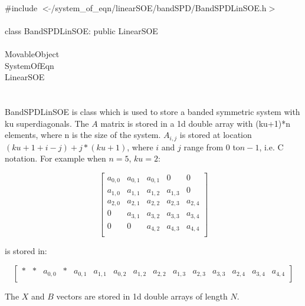 
   \\
\indent \#include $<\tilde{ }$/system\_of\_eqn/linearSOE/bandSPD/BandSPDLinSOE.h$>$  \\

  \\
\indent class BandSPDLinSOE: public LinearSOE \\

 \\
\indent MovableObject \\
\indent\indent SystemOfEqn \\
\indent\indent\indent LinearSOE \\
\indent\indent\indent{} \\

  \\
\indent BandSPDLinSOE is class which is used to store a banded symmetric system
with ku superdiagonals. The $A$ matrix is stored in a
1d double array with (ku+1)*n elements, where n is the size of the
system. $A_{i,j}$ is stored at location $(ku+1+i-j) +
j*(ku+1)$, where $i$ and $j$ range from $0$ to$n-1$, i.e. C
notation. For example when $n=5$, $ku = 2$: 

$$
\left[
\begin{array}{ccccc}
a_{0,0} & a_{0,1}  & a_{0,1} & 0 & 0 \\
a_{1,0} & a_{1,1} & a_{1,2} & a_{1,3} & 0 \\
a_{2,0} & a_{2,1} & a_{2,2} & a_{2,3} & a_{2,4}  \\
0 & a_{3,1} & a_{3,2} & a_{3,3} & a_{3,4} \\
0 & 0 & a_{4,2} & a_{4,3} & a_{4,4} \\
\end{array}
\right] 
$$

is stored in:

$$
\left[
\begin{array}{cccccccccccccccccccc}
* & * & a_{0,0} & * & a_{0,1}  & a_{1,1} & a_{0,2} & a_{1,2} & a_{2,2} &
a_{1,3} & a_{2,3} & a_{3,3} & a_{2,4} & a_{3,4} & a_{4,4}\\
\end{array}
\right] 
$$

The $X$ and $B$ vectors are stored in 1d double arrays of length $N$. \\

